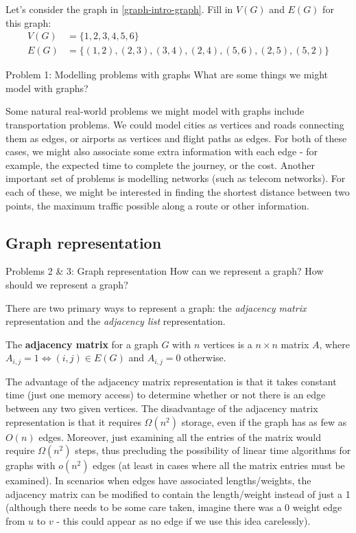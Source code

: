 \documentclass{article}
\begin{document}
\begin{quickcheck}
    Let's consider the graph in \ref{graph-intro-graph}. Fill in $V(G)$ and $E(G)$ for this graph:
    \begin{align*}
        V(G) &= \{1, 2, 3, 4, 5, 6 \}\\
        E(G) &= \{(1, 2), (2, 3), (3, 4), (2, 4), (5, 6), (2, 5), (5, 2) \}
    \end{align*}
\end{quickcheck}

\begin{problem}{Problem 1: Modelling problems with graphs}
    What are some things we might model with graphs?
\end{problem}

Some natural real-world problems we might model with graphs include transportation problems. We could model cities as vertices and roads connecting them as edges, or airports as vertices and flight paths as edges. For both of these cases, we might also associate some extra information with each edge - for example, the expected time to complete the journey, or the cost. Another important set of problems is modelling networks (such as telecom networks). For each of these, we might be interested in finding the shortest distance between two points, the maximum traffic possible along a route or other information.

\subsection{Graph representation}
\begin{problem}{Problems 2 \& 3: Graph representation}
    How can we represent a graph? How should we represent a graph?
\end{problem}

There are two primary ways to represent a graph: the \textit{adjacency matrix} representation and the \textit{adjacency list} representation.

The \textbf{adjacency matrix} for a graph $G$ with $n$ vertices is a $n \times n$ matrix $A$, where $A_{i, j} = 1 \iff (i, j) \in E(G)$ and $A_{i, j} = 0$ otherwise. 

The advantage of the adjacency matrix representation is that it takes constant time (just one memory access) to determine whether or
not there is an edge between any two given vertices. The disadvantage of the adjacency matrix representation is that it requires $\Omega (n^2)$ storage, even if the graph has as few as $O(n)$ edges. Moreover, just examining all the entries of the matrix would require $\Omega (n^2)$ steps, thus precluding the possibility of linear time algorithms for graphs with $o(n^2)$ edges (at least in cases where all the matrix entries must be examined). In scenarios when edges have associated lengths/weights, the adjacency matrix can be modified to contain the length/weight instead of just a 1 (although there needs to be some care taken, imagine there was a 0 weight edge from $u$ to $v$ - this could appear as no edge if we use this idea carelessly).
\end{document}
